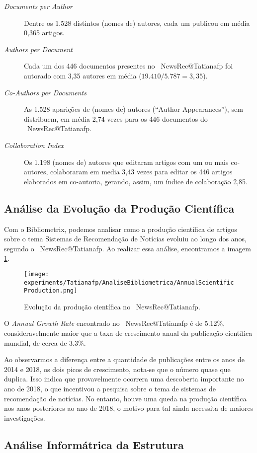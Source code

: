\begin{description}
    \item [\textit{Documents per Author}] Dentre os 1.528 distintos (nomes de) autores, cada um publicou em média 0,365 artigos.
    \item [\textit{Authors per Document}] Cada um dos 446 documentos presentes no \dataset\   NewsRec@Tatianafp foi autorado com 3,35 autores em média ($19.410 / 5.787 = 3,35$).
    \item [\textit{Co-Authors per Documents}] As 1.528 aparições de (nomes de) autores (``Author Appearances''), sem distribuem, em média 2,74 vezes para os 446 documentos do \dataset\  NewsRec@Tatianafp.
    \item [\textit{Collaboration Index}] Os 1.198 (nomes de) autores que editaram artigos com um ou mais co-autores, colaboraram em media 3,43 vezes para editar os 446 artigos elaborados em co-autoria, gerando, assim, um índice de colaboração 2,85. 
\end{description}

\subsection{Análise da Evolução da Produção Científica}

Com o Bibliometrix, podemos analisar como a produção científica de artigos sobre o tema Sistemas de Recomendação de Notícias evoluiu ao longo dos anos, segundo o \dataset\  NewsRec@Tatianafp. Ao realizar essa análise, encontramos a imagem \ref{fig:evol_anual_NewsRec_Tatianafp}. 

\begin{figure}
    \centering
    \texttt{[image: experiments/Tatianafp/AnaliseBibliometrica/AnnualScientificProduction.png]}
    \caption{Evolução da produção científica no \dataset\  NewsRec@Tatianafp.}
    \label{fig:evol_anual_NewsRec_Tatianafp}
\end{figure}

O \textit{Annual Growth Rate} encontrado no \dataset\  NewsRec@Tatianafp é de 5.12\%, consideravelmente maior que a taxa de crescimento anual da publicação científica mundial, de cerca de 3.3\%.

Ao observarmos a diferença entre a quantidade de publicações entre os anos de 2014 e 2018, os dois picos de crescimento, nota-se que o número quase que duplica. Isso indica que provavelmente ocorrera uma descoberta importante no ano de 2018, o que incentivou a pesquisa sobre o tema de sistemas de recomendação de notícias. No entanto, houve uma queda na produção científica nos anos posteriores ao ano de 2018, o motivo para tal ainda necessita de maiores investigações.  

\subsection{Análise Informátrica da Estrutura }


